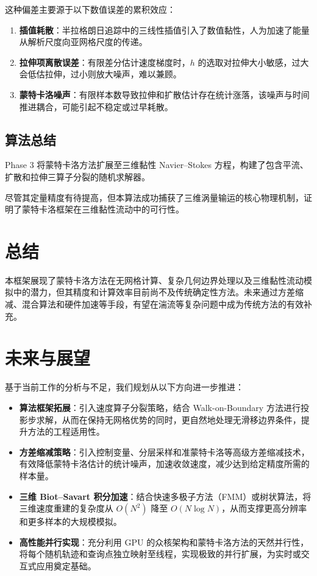 \documentclass[UTF8,fontset=fandol]{ctexart}
\begin{document}
这种偏差主要源于以下数值误差的累积效应：
\begin{enumerate}
    \item \textbf{插值耗散}：半拉格朗日追踪中的三线性插值引入了数值黏性，人为加速了能量从解析尺度向亚网格尺度的传递。
    \item \textbf{拉伸项离散误差}：有限差分估计速度梯度时，$h$ 的选取对拉伸大小敏感，过大会低估拉伸，过小则放大噪声，难以兼顾。
    \item \textbf{蒙特卡洛噪声}：有限样本数导致拉伸和扩散估计存在统计涨落，该噪声与时间推进耦合，可能引起不稳定或过早耗散。
\end{enumerate}

\subsection{算法总结}

Phase 3 将蒙特卡洛方法扩展至三维黏性 Navier–Stokes 方程，构建了包含平流、扩散和拉伸三算子分裂的随机求解器。

尽管其定量精度有待提高，但本算法成功捕获了三维涡量输运的核心物理机制，证明了蒙特卡洛框架在三维黏性流动中的可行性。

\section{总结}

本框架展现了蒙特卡洛方法在无网格计算、复杂几何边界处理以及三维黏性流动模拟中的潜力，但其精度和计算效率目前尚不及传统确定性方法。未来通过方差缩减、混合算法和硬件加速等手段，有望在湍流等复杂问题中成为传统方法的有效补充。

\section{未来与展望}

基于当前工作的分析与不足，我们规划从以下方向进一步推进：

\begin{itemize}
    \item \textbf{算法框架拓展}：引入速度算子分裂策略，结合 Walk-on-Boundary 方法进行投影步求解，从而在保持无网格优势的同时，更自然地处理无滑移边界条件，提升方法的工程适用性。
    \item \textbf{方差缩减策略}：引入控制变量、分层采样和准蒙特卡洛等高级方差缩减技术，有效降低蒙特卡洛估计的统计噪声，加速收敛速度，减少达到给定精度所需的样本量。
    \item \textbf{三维 Biot–Savart 积分加速}：结合快速多极子方法（FMM）或树状算法，将三维速度重建的复杂度从 \(O(N^2)\) 降至 \(O(N \log N)\)，从而支撑更高分辨率和更多样本的大规模模拟。
    \item \textbf{高性能并行实现}：充分利用 GPU 的众核架构和蒙特卡洛方法的天然并行性，将每个随机轨迹和查询点独立映射至线程，实现极致的并行扩展，为实时或交互式应用奠定基础。
\end{itemize}
\end{document}
